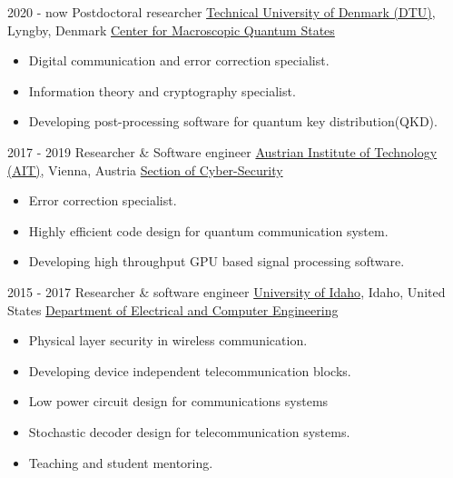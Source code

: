 \documentclass[letterpaper]{hosmacv} %
\begin{document}
\makeprofile %


\begin{hosmaenv} %
	\hosmaitem
    	{2020 - now}
        {Postdoctoral researcher}
        {\href{https://www.dtu.dk/english}{Technical University of Denmark (DTU)}, Lyngby, Denmark}
        {\href{https://www.bigq.fysik.dtu.dk/about-bigq}{Center for Macroscopic Quantum States}}
        {\begin{itemize}\itemsep -2pt
            \item Digital communication and error correction specialist.
            \item Information theory and cryptography specialist.
            \item Developing post-processing software for quantum key distribution(QKD).
        \end{itemize} }
	
	\hosmaitem
    	{2017 - 2019}
        {Researcher \& Software engineer}
        {\href{https://www.ait.ac.at/en/}{Austrian Institute of Technology (AIT)}, Vienna, Austria}
        {\href{https://www.ait.ac.at/en/solutions/cyber-security}{Section of Cyber-Security}}
        {\begin{itemize}\itemsep -2pt
            \item Error correction specialist.
            \item Highly efficient code design for quantum communication system.
            \item Developing high throughput GPU based signal processing software.
        \end{itemize} }
    
    \hosmaitem
    	{2015 - 2017}
        {Researcher \& software engineer}
        {\href{https://www.uidaho.edu/}{University of Idaho}, Idaho, United States}
        {\href{https://www.uidaho.edu/engr/departments/ece}{Department of  Electrical and Computer Engineering}}
        {\begin{itemize}\itemsep -2pt
            \item Physical layer security in wireless communication.
            \item Developing device independent telecommunication blocks.
            \item Low power circuit design for communications systems
            \item Stochastic decoder design for telecommunication systems.
            \item Teaching and student mentoring. 
        \end{itemize} }
        

\end{hosmaenv}
\end{document}
